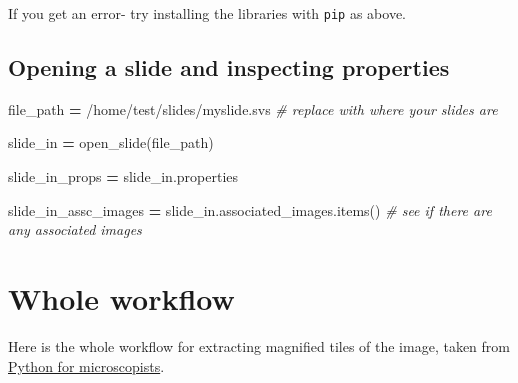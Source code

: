 \documentclass[
]{book}
\newenvironment{Shaded}{\begin{snugshade}}{\end{snugshade}}
\newcommand{\CommentTok}[1]{\textcolor[rgb]{0.56,0.35,0.01}{\textit{#1}}}
\newcommand{\NormalTok}[1]{#1}
\newcommand{\OperatorTok}[1]{\textcolor[rgb]{0.81,0.36,0.00}{\textbf{#1}}}
\newcommand{\StringTok}[1]{\textcolor[rgb]{0.31,0.60,0.02}{#1}}
\begin{document}
If you get an error- try installing the libraries with \texttt{pip} as above.

\hypertarget{opening-a-slide-and-inspecting-properties}{%
\subsection{Opening a slide and inspecting properties}\label{opening-a-slide-and-inspecting-properties}}

\begin{Shaded}
\begin{Highlighting}[]
\NormalTok{file\_path }\OperatorTok{=} \StringTok{\textquotesingle{}/home/test/slides/myslide.svs\textquotesingle{}} \CommentTok{\# replace with where your slides are}

\NormalTok{slide\_in }\OperatorTok{=}\NormalTok{ open\_slide(file\_path)}

\NormalTok{slide\_in\_props }\OperatorTok{=}\NormalTok{ slide\_in.properties}

\NormalTok{slide\_in\_assc\_images }\OperatorTok{=}\NormalTok{ slide\_in.associated\_images.items() }\CommentTok{\# see if there are any associated images}
\end{Highlighting}
\end{Shaded}

\hypertarget{whole-workflow}{%
\section{Whole workflow}\label{whole-workflow}}

Here is the whole workflow for extracting magnified tiles of the image, taken from \href{https://github.com/bnsreenu/python_for_microscopists}{Python for microscopists}.
\end{document}
